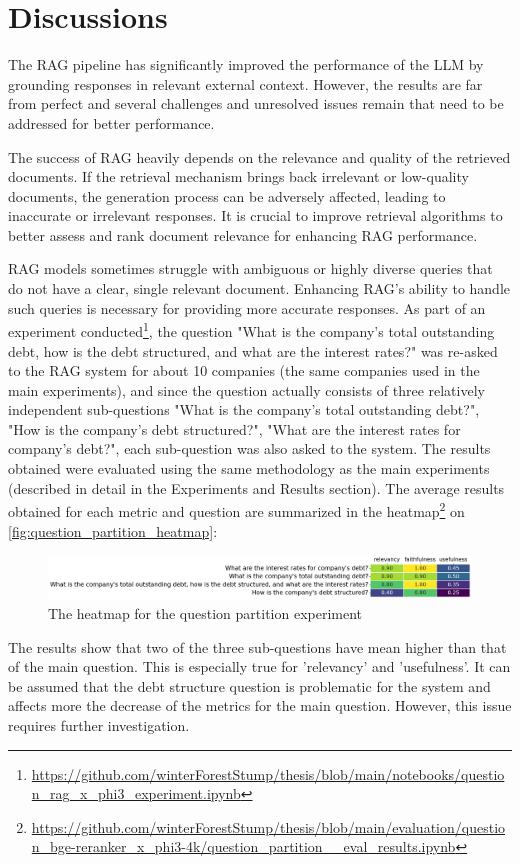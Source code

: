 \section{Discussions}
The RAG pipeline has significantly improved the performance of the LLM by grounding responses in relevant external context. However, the results are far from perfect and several challenges and unresolved issues remain that need to be addressed for better performance.

The success of RAG heavily depends on the relevance and quality of the retrieved documents. If the retrieval mechanism brings back irrelevant or low-quality documents, the generation process can be adversely affected, leading to inaccurate or irrelevant responses. It is crucial to improve retrieval algorithms to better assess and rank document relevance for enhancing RAG performance.

RAG models sometimes struggle with ambiguous or highly diverse queries that do not have a clear, single relevant document. Enhancing RAG’s ability to handle such queries is necessary for providing more accurate responses. As part of an experiment conducted\footnote{\url{https://github.com/winterForestStump/thesis/blob/main/notebooks/question_rag_x_phi3_experiment.ipynb}}, the question "What is the company's total outstanding debt, how is the debt structured, and what are the interest rates?" was re-asked to the RAG system for about 10 companies (the same companies used in the main experiments), and since the question actually consists of three relatively independent sub-questions "What is the company's total outstanding debt?", "How is the company's debt structured?", "What are the interest rates for company's debt?", each sub-question was also asked to the system. The results obtained were evaluated using the same methodology as the main experiments (described in detail in the Experiments and Results section). The average results obtained for each metric and question are summarized in the heatmap\footnote{\url{https://github.com/winterForestStump/thesis/blob/main/evaluation/question_bge-reranker_x_phi3-4k/question_partition__eval_results.ipynb}} on \autoref{fig:question_partition_heatmap}:
\begin{figure}[h!]
\centering
\includegraphics[width=1\textwidth]{Figures/question_partition_heatmap.png}
\caption{The heatmap for the question partition experiment}
\label{fig:question_partition_heatmap}
\end{figure}
The results show that two of the three sub-questions have mean higher than that of the main question. This is especially true for 'relevancy' and 'usefulness'. It can be assumed that the debt structure question is problematic for the system and affects more the decrease of the metrics for the main question. However, this issue requires further investigation.

